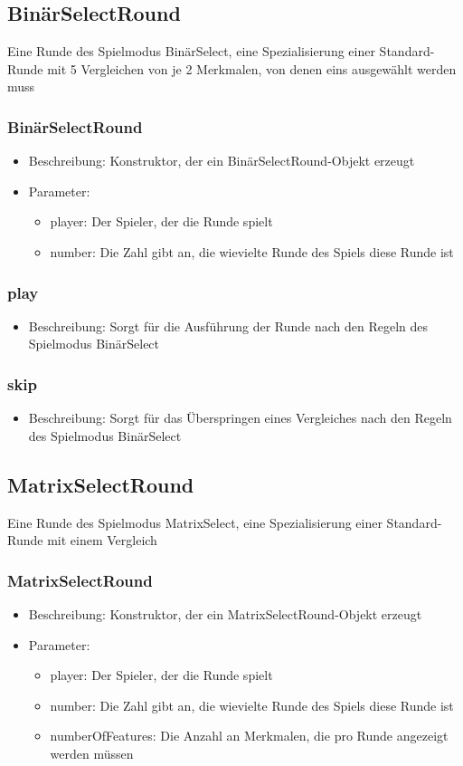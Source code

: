 \documentclass[a4paper]{scrreprt}
\begin{document}
	
	\subsection{BinärSelectRound}
	Eine Runde des Spielmodus BinärSelect, eine Spezialisierung einer Standard-Runde mit 5 Vergleichen von je 2 Merkmalen, von denen eins ausgewählt werden muss
	\subsubsection{BinärSelectRound}
		\begin{itemize}
		\item Beschreibung: Konstruktor, der ein BinärSelectRound-Objekt erzeugt
		\item Parameter:
		\begin{itemize}
				\item player: Der Spieler, der die Runde spielt
				\item number: Die Zahl gibt an, die wievielte Runde des Spiels diese Runde ist
				\end{itemize}
		\end{itemize}
	\subsubsection{play}
	\begin{itemize}
		\item Beschreibung: Sorgt für die Ausführung der Runde nach den Regeln des Spielmodus BinärSelect
	\end{itemize}
	\subsubsection{skip}
	\begin{itemize}
		\item Beschreibung: Sorgt für das Überspringen eines Vergleiches nach den Regeln des Spielmodus BinärSelect
	\end{itemize}
	
	\subsection{MatrixSelectRound}
	Eine Runde des Spielmodus MatrixSelect, eine Spezialisierung einer Standard-Runde mit einem Vergleich
	\subsubsection{MatrixSelectRound}
		\begin{itemize}
		\item Beschreibung: Konstruktor, der ein MatrixSelectRound-Objekt erzeugt
		\item Parameter: 
		\begin{itemize}
				\item player: Der Spieler, der die Runde spielt
				\item number: Die Zahl gibt an, die wievielte Runde des Spiels diese Runde ist
				\item numberOfFeatures: Die Anzahl an Merkmalen, die pro Runde angezeigt werden müssen
				\end{itemize}	
		\end{itemize}
\end{document}
